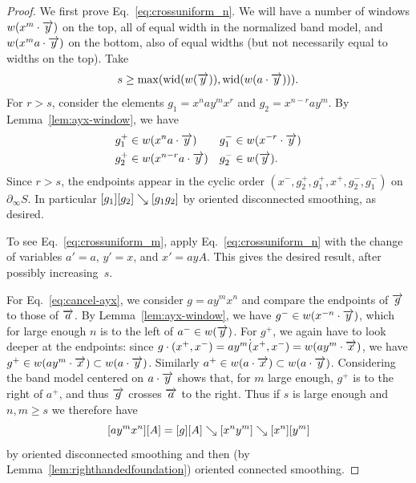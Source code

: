 \begin{proof}
  We first prove Eq.~\eqref{eq:crossuniform_n}. We will have a number
  of windows $w(x^m \cdot \overrightarrow{y})$ on the top, all of equal width
  in the normalized band model, and $w(x^m a \cdot \overrightarrow{y})$ on the
  bottom, also of equal widths (but not necessarily equal to widths on
  the top). Take
  \[
    s \ge \max(\operatorname{wid}(w(\overrightarrow{y})),
    \operatorname{wid}(w(a\cdot\overrightarrow{y}))).
  \]
  For $r > s$, consider the elements $g_1 = x^n ay^m x^r$ and $g_2 =
  x^{n-r} a y^m$. By Lemma~\ref{lem:ayx-window}, we have
  \begin{align*}
    g_1^+ &\in w(x^n a\cdot\overrightarrow{y}) & g_1^- &\in w(x^{-r}\cdot\overrightarrow{y})\\
    g_2^+ &\in w(x^{n-r} a \cdot\overrightarrow{y}) & g_2^- &\in w(\overrightarrow{y}).
  \end{align*}
  Since $r>s$, the endpoints appear in the cyclic order
  $(x^-,g_2^+,g_1^+,x^+,g_2^-,g_1^-)$ on $\partial_\infty S$. In
  particular $[g_1][g_2] \mathrel{\searrow} [g_1 g_2]$ by oriented disconnected smoothing, as desired.
  
  To see Eq.~\eqref{eq:crossuniform_m}, apply
  Eq.~\eqref{eq:crossuniform_n} with the change of variables
  $a' = a$, $y' = x$, and $x' = ayA$.
  This gives the desired result, after possibly increasing~$s$.

  For Eq.~\eqref{eq:cancel-ayx}, we consider $g = a y ^m x^n$ and
  compare the endpoints of $\overrightarrow{g}$ to those of $\overrightarrow{a}$. By
  Lemma~\ref{lem:ayx-window}, we have
  $g^- \in w(x^{-n} \cdot \overrightarrow{y})$, which for large enough $n$ is to
  the left of $a^- \in w(\overrightarrow{y})$. For $g^+$,
  we again have to look deeper at the endpoints: since
  $g \cdot (x^+,x^-) = a y^m \dot (x^+, x^-) = w(a y^m \cdot
  \overrightarrow{x})$, we have
  $g^+ \in w(a y^m \cdot \overrightarrow{x}) \subset w(a \cdot \overrightarrow{y})$.
  Similarly $a^+ \in w(a \cdot \overrightarrow{x}) \subset w(a \cdot \overrightarrow{y})$.
  Considering the band model centered on $a \cdot \overrightarrow{y}$ shows that,
  for $m$ large enough, $g^+$ is to the right of $a^+$, and thus
  $\overrightarrow{g}$ crosses $\overrightarrow{a}$ to the right. Thus if $s$ is large
  enough and $n,m
  \ge s$ we therefore have
  \[
    [a y^m x^n][A] = [g][A] \mathrel{\searrow} [x^n y^m] \mathrel{\searrow} [x^n][y^m]
  \]
  by oriented disconnected smoothing and then (by
  Lemma~\ref{lem:righthandedfoundation}) oriented connected
  smoothing.


\end{proof}
